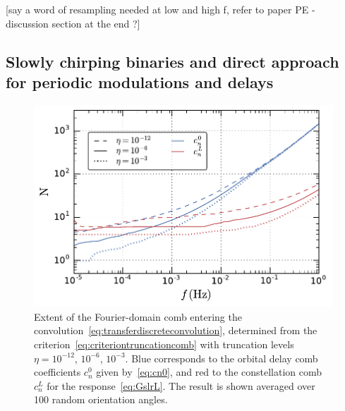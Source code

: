 \documentclass[aps,showpacs,twocolumn,
prd,superscriptaddress,nofootinbib]{revtex4-1}
\newcommand{\SM}[1]{{\color{Red} #1}}
\begin{document}
\SM{[say a word of resampling needed at low and high f, refer to paper PE - discussion section at the end ?]}


\subsection{Slowly chirping binaries and direct approach for periodic modulations and delays}\label{subsec:comblisa}

\begin{figure}
  \centering
  \includegraphics[width=.98\linewidth]{plots/LISACombExtent_py.pdf}
  \caption{Extent of the Fourier-domain comb entering the convolution~\eqref{eq:transferdiscreteconvolution}, determined from the criterion~\eqref{eq:criteriontruncationcomb} with truncation levels $\eta=10^{-12}$, $10^{-6}$, $10^{-3}$. Blue corresponds to the orbital delay comb coefficients $c_{n}^{0}$ given by~\eqref{eq:cn0}, and red to the constellation comb $c_{n}^{L}$ for the response~\eqref{eq:GslrL}. The result is shown averaged over 100 random orientation angles.}
  \label{fig:lisacombextent}
\end{figure}
\end{document}
